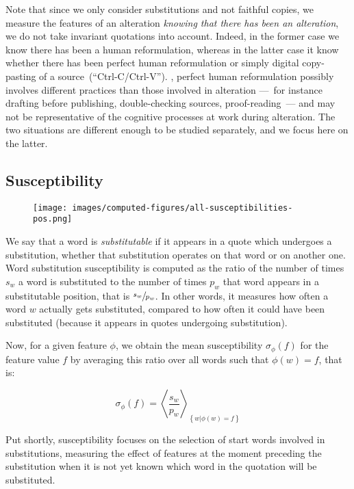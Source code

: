 Note that since we only consider substitutions and not faithful copies, we measure the features of an alteration \emph{knowing that there has been an alteration},  we do not take invariant quotations into account.
Indeed, in the former case we know there has been a human reformulation, whereas in the latter case it  know whether there has been perfect human reformulation or simply digital copy-pasting of a source~(``{\sc Ctrl-C}/{\sc Ctrl-V}'').
, perfect human reformulation possibly involves different practices than those involved in alteration ---~for instance drafting before publishing, double-checking sources, proof-reading~--- and may not be representative of the cognitive processes at work during alteration.
The two situations are different enough to be studied separately, and we focus here on the latter.

\subsection{Susceptibility}

\begin{figure}[h]
    \centering
    \texttt{[image: images/computed-figures/all-susceptibilities-pos.png]}
    \caption{}
    \label{fig:pos-susceptibilities}
\end{figure}

We say that a word is \emph{substitutable} if it appears in a quote which undergoes a substitution, whether that substitution operates on that word or on another one.
Word substitution susceptibility is computed as the ratio of the number of times $s_w$ a word is substituted to the number of times $p_w$ that word appears in a substitutable position, that is $\sfrac{s_w}{p_w}$. {In other words, it measures how often a word $w$ actually gets substituted, compared to how often it could have been substituted (because it appears in quotes undergoing substitution)}.

Now, for a given feature $\phi$, we obtain the mean susceptibility $\sigma_{\phi}(f)$ for the feature value $f$ by averaging this ratio over all words such that $\phi(w) = f$, that is:

$$\sigma_{\phi}(f) = \left< \frac{s_w}{p_w} \right>_{\left\lbrace w | \phi(w) = f \right\rbrace}$$

Put shortly, susceptibility focuses on the selection of start words involved in substitutions, measuring the effect of features at the moment preceding the substitution when it is not yet known which word in the quotation will be substituted.

